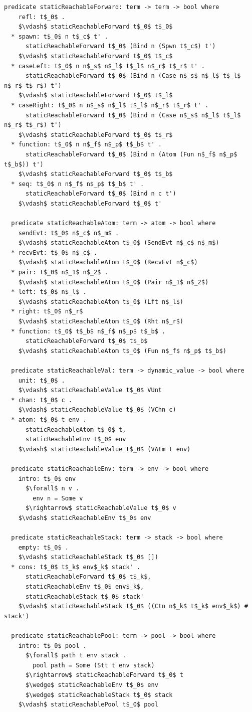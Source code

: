 \documentclass[letterpaper, 11pt]{extarticle}
\begin{document}
\begin{lstlisting}[language=logic, mathescape]
  predicate staticReachableForward: term -> term -> bool where
    refl: t$_0$ .
    $\vdash$ staticReachableForward t$_0$ t$_0$
  * spawn: t$_0$ n t$_c$ t' .
      staticReachableForward t$_0$ (Bind n (Spwn t$_c$) t')
    $\vdash$ staticReachableForward t$_0$ t$_c$
  * caseLeft: t$_0$ n n$_s$ n$_l$ t$_l$ n$_r$ t$_r$ t' .
      staticReachableForward t$_0$ (Bind n (Case n$_s$ n$_l$ t$_l$ n$_r$ t$_r$) t')
    $\vdash$ staticReachableForward t$_0$ t$_l$
  * caseRight: t$_0$ n n$_s$ n$_l$ t$_l$ n$_r$ t$_r$ t' .
      staticReachableForward t$_0$ (Bind n (Case n$_s$ n$_l$ t$_l$ n$_r$ t$_r$) t')
    $\vdash$ staticReachableForward t$_0$ t$_r$
  * function: t$_0$ n n$_f$ n$_p$ t$_b$ t' .
      staticReachableForward t$_0$ (Bind n (Atom (Fun n$_f$ n$_p$ t$_b$)) t')
    $\vdash$ staticReachableForward t$_0$ t$_b$
  * seq: t$_0$ n n$_f$ n$_p$ t$_b$ t' .
      staticReachableForward t$_0$ (Bind n c t')
    $\vdash$ staticReachableForward t$_0$ t'

  predicate staticReachableAtom: term -> atom -> bool where
    sendEvt: t$_0$ n$_c$ n$_m$ .
    $\vdash$ staticReachableAtom t$_0$ (SendEvt n$_c$ n$_m$)
  * recvEvt: t$_0$ n$_c$ .
    $\vdash$ staticReachableAtom t$_0$ (RecvEvt n$_c$)
  * pair: t$_0$ n$_1$ n$_2$ .
    $\vdash$ staticReachableAtom t$_0$ (Pair n$_1$ n$_2$)
  * left: t$_0$ n$_l$ .
    $\vdash$ staticReachableAtom t$_0$ (Lft n$_l$)
  * right: t$_0$ n$_r$
    $\vdash$ staticReachableAtom t$_0$ (Rht n$_r$)
  * function: t$_0$ t$_b$ n$_f$ n$_p$ t$_b$ . 
      staticReachableForward t$_0$ t$_b$ 
    $\vdash$ staticReachableAtom t$_0$ (Fun n$_f$ n$_p$ t$_b$)

  predicate staticReachableVal: term -> dynamic_value -> bool where
    unit: t$_0$ .
    $\vdash$ staticReachableValue t$_0$ VUnt
  * chan: t$_0$ c .
    $\vdash$ staticReachableValue t$_0$ (VChn c)
  * atom: t$_0$ t env .
      staticReachableAtom t$_0$ t, 
      staticReachableEnv t$_0$ env
    $\vdash$ staticReachableValue t$_0$ (VAtm t env)

  predicate staticReachableEnv: term -> env -> bool where
    intro: t$_0$ env
      $\forall$ n v . 
        env n = Some v
      $\rightarrow$ staticReachableValue t$_0$ v
    $\vdash$ staticReachableEnv t$_0$ env

  predicate staticReachableStack: term -> stack -> bool where
    empty: t$_0$ .
    $\vdash$ staticReachableStack t$_0$ [])
  * cons: t$_0$ t$_k$ env$_k$ stack' .
      staticReachableForward t$_0$ t$_k$, 
      staticReachableEnv t$_0$ env$_k$,
      staticReachableStack t$_0$ stack' 
    $\vdash$ staticReachableStack t$_0$ ((Ctn n$_k$ t$_k$ env$_k$) # stack')

  predicate staticReachablePool: term -> pool -> bool where
    intro: t$_0$ pool .
      $\forall$ path t env stack .
        pool path = Some (Stt t env stack) 
      $\rightarrow$ staticReachableForward t$_0$ t
      $\wedge$ staticReachableEnv t$_0$ env
      $\wedge$ staticReachableStack t$_0$ stack
    $\vdash$ staticReachablePool t$_0$ pool

\end{lstlisting}
\end{document}
